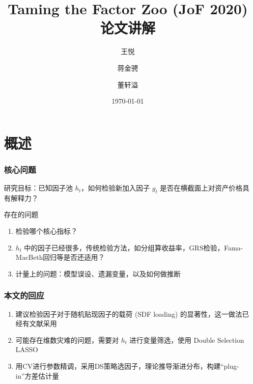 \documentclass[
  UTF8,
  xcolor={dvipsnames,rgb},
  hyperref={colorlinks, citecolor=orange, linkcolor=black},
  aspectratio=169
  ]{beamer}
\title{Taming the Factor Zoo (JoF 2020) 论文讲解}
\date{\today}
\author{王悦 \and 蒋金骋 \and 董轩溢}
\institute{金融机器学习第一组}
\begin{document}
\begin{frame}
    \maketitle
\end{frame}

\begin{frame}
    \tableofcontents
\end{frame}

\section{概述}

\begin{frame}
    \frametitle{核心问题}

    \begin{wideitemize}
        \item 研究目标：已知因子池 \(h_{t}\)，如何检验新加入因子 \(g_{t}\) 是否在横截面上对资产价格具有解释力？
        \item 存在的问题 \begin{enumerate}
            \item 检验哪个核心指标？
            \item \(h_{t}\) 中的因子已经很多，传统检验方法，如分组算收益率\parencite{FamaJournalofFinancialEconomics1993}，GRS检验\parencite{GibbonsEconometrica1989}，Fama-MacBeth回归\parencite{FamaJ.Polit.Econ.1973}等是否还适用？
            \item 计量上的问题：模型误设、遗漏变量，以及如何做推断
        \end{enumerate}
    \end{wideitemize}
\end{frame}

\begin{frame}
    \frametitle{本文的回应}
    \begin{enumerate}
        \item \textcite{Cochrane2009,CochraneTheJournalofFinance2011}建议检验因子对于随机贴现因子的载荷 (SDF loading) 的显著性，这一做法已经有文献采用\parencite{KozakTheJournalofFinance2018,KozakJournalofFinancialEconomics2020}
        \item 可能存在维数灾难的问题，需要对 \(h_{t}\) 进行变量筛选，使用 Double Selection LASSO\parencite{BelloniTheReviewofEconomicStudies2014}
        \item 用CV进行参数精调，采用DS策略选因子，理论推导渐进分布，构建``plug-in''方差估计量
    \end{enumerate}
\end{frame}
\end{document}

